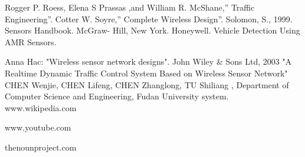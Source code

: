 \documentclass{SureshLimkar}
\begin{document}
\begin{thebibliography}{9}
Rogger P. Roess, Elena S Prassas ,and William R. McShane,” Traffic Engineering”.
  Cotter W. Soyre,” Complete Wireless Design”.
 Solomon, S., 1999. Sensors Handbook. McGraw- Hill, New York.
 Honeywell. Vehicle Detection Using AMR Sensors.

 Anna Hac: "Wireless sensor network designs". John Wiley & Sons Ltd, 2003
 "A Realtime Dynamic Traffic Control System Based on Wireless Sensor Network"    CHEN Wenjie, CHEN Lifeng, CHEN Zhanglong, TU Shiliang ,   Department of Computer Science and Engineering, Fudan University system.
www.wikipedia.com

www.youtube.com

thenounproject.com

\end{thebibliography}
\end{document}
